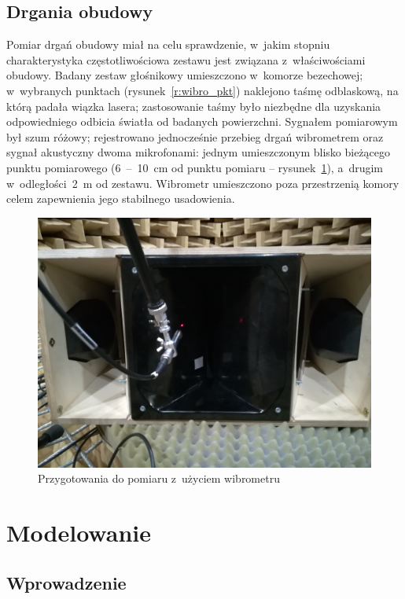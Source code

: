 \documentclass[12pt]{oska}
\newcommand{\range}[2]{\num{#1}~--~\num{#2}}
\begin{document}
	\subsection{Drgania obudowy}
	
	Pomiar drgań obudowy miał na celu sprawdzenie, w~jakim stopniu charakterystyka częstotliwościowa zestawu jest związana z~właściwościami obudowy. Badany zestaw głośnikowy umieszczono w~komorze bezechowej; w~wybranych punktach (rysunek~\ref{r:wibro_pkt}) naklejono taśmę odblaskową, na którą padała wiązka lasera; zastosowanie taśmy było niezbędne dla uzyskania odpowiedniego odbicia światła od badanych powierzchni. %
	Sygnałem pomiarowym był szum różowy; rejestrowano jednocześnie przebieg drgań wibrometrem oraz sygnał akustyczny dwoma mikrofonami: jednym umieszczonym blisko bieżącego punktu pomiarowego (\range{6}{10}~\si{\cm} od punktu pomiaru -- rysunek~\ref{r:wibro_zdjecie}), a~drugim w~odległości~\SI{2}{\metre} od zestawu. Wibrometr umieszczono poza przestrzenią komory celem zapewnienia jego stabilnego usadowienia.
	
	\begin{figure}[!ht]
		\centering
		\includegraphics[width=.7\textwidth]{zdjecie_wibro.jpg}
		\caption{Przygotowania do pomiaru z~użyciem wibrometru}
		\label{r:wibro_zdjecie}
	\end{figure}
	
	
	\section{Modelowanie}
	
	\subsection{Wprowadzenie}
	
\end{document}
